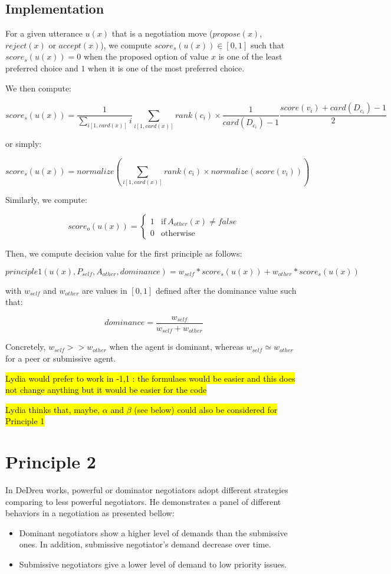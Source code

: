 \documentclass{llncs}
\begin{document}
\subsection{Implementation}
For a given utterance $u(x)$ that is a negotiation move ($propose(x)$, $reject(x)$ or $accept(x)$), we compute $score_s(u(x))\in[0,1]$ such that $score_s(u(x))=0$ when the proposed option of value $x$ is one of the least preferred choice and $1$ when it is one of the most preferred choice.

We then compute: 

$$score_s(u(x)) = \frac{1}{\sum_{i[1,card(x)]} i} \sum_{i[1,card(x)]} rank(c_i)\times \frac{1}{card(D_{c_i})-1} \frac{score(v_i)+card(D_{c_i})-1}{2} $$

or simply:

$$score_s(u(x)) = normalize \left( \sum_{i[1,card(x)]} rank(c_i)\times normalize ( score(v_i) ) \right) $$


Similarly, we compute:

$$score_o(u(x)) = \left\{\begin{array}{ll}
1 & \mathrm{if\ }A_{other}(x)\neq false\\
0 & \mathrm{otherwise}
\end{array}\right.$$

Then, we compute decision value for the first principle as follows:

$$principle1(u(x),P_{self},A_{other},dominance) = w_{self} * score_s(u(x)) + w_{other} * score_s(u(x))$$

with $w_{self}$ and $w_{other}$ are values in $[0,1]$ defined after the dominance value such that:

$$dominance = \frac{w_{self}}{w_{self}+w_{other}}$$

Concretely, $w_{self}>>w_{other}$ when the agent is dominant, whereas $w_{self}\simeq w_{other}$ for a peer or submissive agent.


\hl{Lydia would prefer to work in -1,1 : the formulaes would be easier and this does not change anything but it would be easier for the code}

\hl{Lydia thinks that, maybe, $\alpha$ and $\beta$ (see below) could also be considered for Principle 1}


\section{Principle 2}

In DeDreu works, powerful or dominator negotiators adopt different strategies comparing to less powerful negotiators. He demonstrates a panel of different behaviors in a negotiation as presented bellow:
\begin{itemize}
	\item Dominant negotiators show a higher level of demands than the submissive ones. In addition, submissive negotiator's demand decrease over time. 
	\item Submissive negotiators give a lower level of demand to low priority issues.
\end{itemize} 
\end{document}
